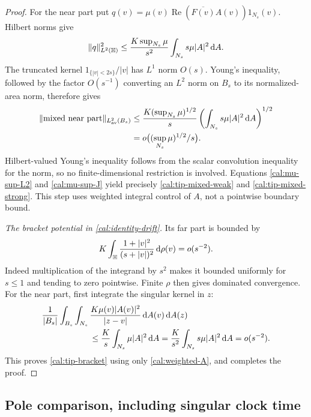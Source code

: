 \begin{proof}
For the near part put
$q(v)=\mu(v)\operatorname{Re}(\overline{F(v)}A(v))1_{N_s}(v)$.
Hilbert norms give
\begin{equation}
 \|q\|_{L^2(\mathbb H)}^2
 \leq \frac{K\sup_{N_s}\mu}{s^2}
                      \int_{N_s}s\mu|A|^2\,\mathrm d A.
 \label{cal:mixed-near-input}
\end{equation}
The truncated kernel $1_{\{|v|<2s\}}/|v|$ has $L^1$ norm $O(s)$.
Young's inequality, followed by the factor $O(s^{-1})$ converting an
$L^2$ norm on $B_s$ to its normalized-area norm, therefore gives
\begin{equation}
 \begin{aligned}
 \|\text{mixed near part}\|_{L^2_{\rm av}(B_s)}
 &\leq \frac{K(\sup_{N_s}\mu)^{1/2}}s
       \left(\int_{N_s}s\mu|A|^2\,\mathrm d A\right)^{1/2}\\
 &=o\bigl((\sup_{N_s}\mu)^{1/2}/s\bigr).
 \end{aligned}
 \label{cal:mixed-near}
\end{equation}
Hilbert-valued Young's inequality follows from the scalar convolution
inequality for the norm, so no finite-dimensional restriction is
involved.  Equations \eqref{cal:mu-sup-L2} and
\eqref{cal:mu-sup-J} yield precisely
\eqref{cal:tip-mixed-weak} and \eqref{cal:tip-mixed-strong}.
This step uses weighted integral control of $A$, not a pointwise
boundary bound.

\smallskip\noindent
\emph{The bracket potential in \eqref{cal:identity-drift}.}
Its far part is bounded by
\[
 K\int_{\mathbb H}\frac{1+|v|^2}{(s+|v|)^2}\,\mathrm d\rho(v)=o(s^{-2}).
\]
Indeed multiplication of the integrand by $s^2$ makes it bounded
uniformly for $s\leq1$ and tending to zero pointwise.  Finite $\rho$
then gives dominated convergence.  For the near part, first integrate
the singular kernel in $z$:
\begin{align*}
 &\frac1{|B_s|}\int_{B_s}\int_{N_s}
          \frac{K\mu(v)|A(v)|^2}{|z-v|}\,\dd A(v)\,\dd A(z)\\
 &\hspace{20mm}\leq\frac K s\int_{N_s}\mu|A|^2\,\dd A
   =\frac K{s^2}\int_{N_s}s\mu|A|^2\,\dd A=o(s^{-2}).
\end{align*}
This proves \eqref{cal:tip-bracket} using only
\eqref{cal:weighted-A}, and completes the proof.
\end{proof}

\subsection{Pole comparison, including singular clock time}
\label{cal:comparison-subsection}

